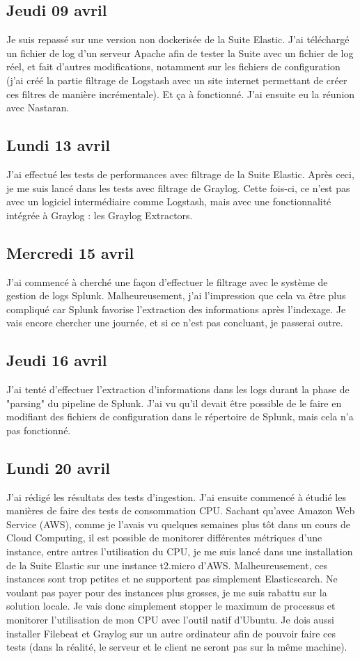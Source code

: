 \documentclass[paper=a4, fontsize=11pt]{scrartcl}
\begin{document}
\subsection{Jeudi 09 avril}
    Je suis repassé sur une version non dockerisée de la Suite Elastic. J'ai téléchargé un fichier de log d'un serveur Apache afin de tester la Suite avec un fichier de log réel, et fait d'autres modifications, notamment sur les fichiers de configuration (j'ai créé la partie \og filtrage \fg de Logstash avec un site internet permettant de créer ces filtres de manière incrémentale). Et ça à fonctionné. J'ai ensuite eu la réunion avec Nastaran.
\subsection{Lundi 13 avril}
    J'ai effectué les tests de performances avec filtrage de la Suite Elastic. Après ceci, je me suis lancé dans les tests avec filtrage de Graylog. Cette fois-ci, ce n'est pas avec un logiciel intermédiaire comme Logstash, mais avec une fonctionnalité intégrée à Graylog : les Graylog Extractors.
\subsection{Mercredi 15 avril}
    J'ai commencé à cherché une façon d'effectuer le filtrage avec le système de gestion de logs Splunk. Malheureusement, j'ai l'impression que cela va être plus compliqué car Splunk favorise l'extraction des informations après l'indexage. Je vais encore chercher une journée, et si ce n'est pas concluant, je passerai outre.
\subsection{Jeudi 16 avril}
    J'ai tenté d'effectuer l'extraction d'informations dans les logs durant la phase de "parsing" du pipeline de Splunk. J'ai vu qu'il devait être possible de le faire en modifiant des fichiers de configuration dans le répertoire de Splunk, mais cela n'a pas fonctionné.
\subsection{Lundi 20 avril}
    J'ai rédigé les résultats des tests d'ingestion. J'ai ensuite commencé à étudié les manières de faire des tests de consommation CPU. Sachant qu'avec Amazon Web Service (AWS), comme je l'avais vu quelques semaines plus tôt dans un cours de Cloud Computing, il est possible de monitorer différentes métriques d'une instance, entre autres l'utilisation du CPU, je me suis lancé dans une installation de la Suite Elastic sur une instance t2.micro d'AWS. Malheureusement, ces instances sont trop petites et ne supportent pas simplement Elasticsearch. Ne voulant pas payer pour des instances plus grosses, je me suis rabattu sur la solution locale. Je vais donc simplement stopper le maximum de processus et monitorer l'utilisation de mon CPU avec l'outil natif d'Ubuntu. Je dois aussi installer Filebeat et Graylog sur un autre ordinateur afin de pouvoir faire ces tests (dans la réalité, le serveur et le client ne seront pas sur la même machine).
\end{document}

